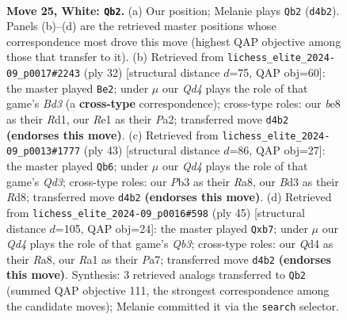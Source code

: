 \documentclass[11pt]{article}
\begin{document}
\clearpage

\begin{figure}[p]\centering
\begin{subfigure}{0.46\textwidth}\centering
\resizebox{\linewidth}{!}{%
\newchessgame
\chessboard[
  setfen={r2qb1k1/p4ppp/5n2/p2pN3/1r1Q2PP/1P1B4/P4P2/R3R1K1 w - - 5 25},
  showmover=false,
  pgfstyle=straightmove, color=movearrow, markmove={d4-b2}
]}
\caption{}
\end{subfigure}\hfill
\begin{subfigure}{0.46\textwidth}\centering
\resizebox{\linewidth}{!}{%
\newchessgame
\chessboard[
  setfen={r1bq1rk1/6pp/pp2p3/2np4/3Q1P1P/2NB4/PPP3P1/2KR3R w - - 1 17},
  showmover=false,
  pgfstyle=straightmove, color=movearrow, markmove={d3-e2}
]}
\caption{}
\end{subfigure}
\\[4pt]
\begin{subfigure}{0.46\textwidth}\centering
\resizebox{\linewidth}{!}{%
\newchessgame
\chessboard[
  setfen={r2r2k1/pp3pp1/3qb2p/2n1P2R/3p1N2/P2P2P1/1P1Q2BP/5RK1 b - - 0 22},
  showmover=false,
  pgfstyle=straightmove, color=movearrow, markmove={d6-b6}
]}
\caption{}
\end{subfigure}\hfill
\begin{subfigure}{0.46\textwidth}\centering
\resizebox{\linewidth}{!}{%
\newchessgame
\chessboard[
  setfen={r3r1k1/pP3pp1/1q2b2p/n3N3/1b2N3/3P3P/P3QPP1/R1B2BK1 b - - 0 23},
  showmover=false,
  pgfstyle=straightmove, color=movearrow, markmove={b6-b7}
]}
\caption{}
\end{subfigure}
\caption{\textbf{Move 25, White: \texttt{Qb2}.} (a) Our position; Melanie plays \texttt{Qb2} (\texttt{d4b2}). Panels (b)--(d) are the retrieved master positions whose correspondence most drove this move (highest QAP objective among those that transfer to it). (b) Retrieved from \texttt{lichess\_elite\_2024-09\_p0017\#2243} (ply 32) [structural distance $d$=75, QAP obj=60]: the master played \texttt{Be2}; under $\mu$ our \emph{Qd4} plays the role of that game's \emph{Bd3} (a \textbf{cross-type} correspondence); cross-type roles: our \emph{b}e8 as their \emph{R}d1, our \emph{R}e1 as their \emph{P}a2; transferred move \texttt{d4b2} \textbf{(endorses this move)}. (c) Retrieved from \texttt{lichess\_elite\_2024-09\_p0013\#1777} (ply 43) [structural distance $d$=86, QAP obj=27]: the master played \texttt{Qb6}; under $\mu$ our \emph{Qd4} plays the role of that game's \emph{Qd3}; cross-type roles: our \emph{P}b3 as their \emph{R}a8, our \emph{B}d3 as their \emph{R}d8; transferred move \texttt{d4b2} \textbf{(endorses this move)}. (d) Retrieved from \texttt{lichess\_elite\_2024-09\_p0016\#598} (ply 45) [structural distance $d$=105, QAP obj=24]: the master played \texttt{Qxb7}; under $\mu$ our \emph{Qd4} plays the role of that game's \emph{Qb3}; cross-type roles: our \emph{Q}d4 as their \emph{R}a8, our \emph{R}a1 as their \emph{P}a7; transferred move \texttt{d4b2} \textbf{(endorses this move)}. Synthesis: 3 retrieved analogs transferred to \texttt{Qb2} (summed QAP objective 111, the strongest correspondence among the candidate moves); Melanie committed it via the \texttt{search} selector.}
\label{fig:thought-m48}
\end{figure}
\end{document}
